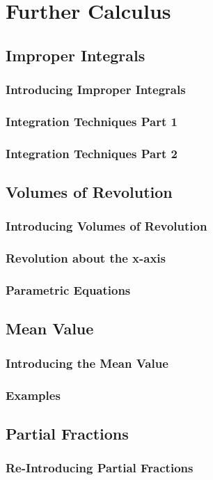 \documentclass[../alevelmaths.tex]{subfiles}
\begin{document}
\chapter{Further Calculus}
\section{Improper Integrals}
\subsection*{Introducing Improper Integrals}
\subsection*{Integration Techniques Part 1}
\subsection*{Integration Techniques Part 2}
\section{Volumes of Revolution}
\subsection*{Introducing Volumes of Revolution}
\subsection*{Revolution about the x-axis}
\subsection*{Parametric Equations}
\section{Mean Value}
\subsection*{Introducing the Mean Value}
\subsection*{Examples}
\section{Partial Fractions}
\subsection*{Re-Introducing Partial Fractions}
\end{document}
